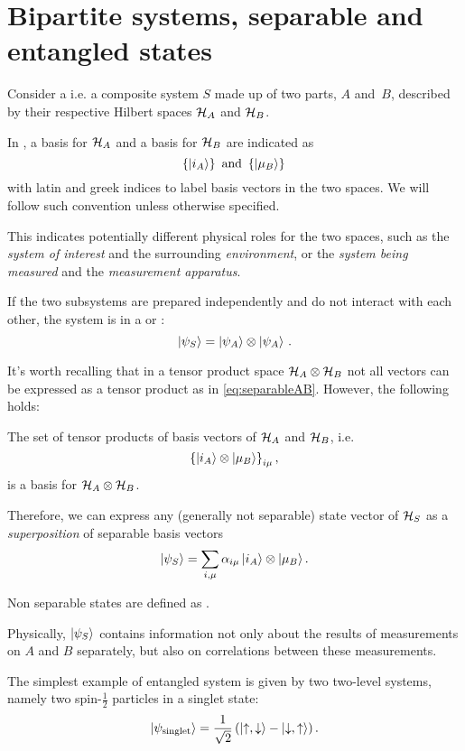 \section{Bipartite systems, separable and entangled states}

Consider a 
i.e. a composite system $S$
made up of two parts, $A$ and~$B$,
described by their respective Hilbert spaces
$\mathcal{H}_A$ and $\mathcal{H}_B$.

In \cite{Haroche_Exploring},
a basis for $\mathcal{H}_A$ and a basis for $\mathcal{H}_B$
are indicated as
$$
  \left\{\ket{i_A}\right\} \text{ and } \left\{\ket{\mu_B}\right\}\,
$$
with latin and greek indices to label basis vectors in the two spaces.
We will follow such convention unless otherwise specified.

This indicates potentially different physical roles for the two spaces,
such as the \emph{system of interest} and the surrounding \emph{environment},
or the \emph{system being measured} and the \emph{measurement apparatus}.

If the two subsystems are prepared independently and do not interact with each other,
the system is in a  or :
\begin{equation}\label{eq:separableAB}
  \ket{\psi_S} = \ket{\psi_A}\otimes\ket{\psi_A} \,\text{.}
\end{equation}

It's worth recalling that in a tensor product space $\mathcal{H}_A\otimes\mathcal{H}_B$
not all vectors can be expressed as a tensor product as in \eqref{eq:separableAB}.
However, the following holds:

\begin{proposition}\label{TensorBase}
The set of tensor products of basis vectors of $\mathcal{H}_A$ and $\mathcal{H}_B$,
i.e. $$\left\{\ket{i_A} \otimes \ket{\mu_B}\right\}_{i\mu},$$
is a basis for $\mathcal{H}_A \otimes \mathcal{H}_B$.
\end{proposition}
Therefore, we can express any
(generally not separable) state vector of $\mathcal{H}_S$
as a \emph{superposition} of separable basis vectors
\begin{equation}\label{eq:bipartite_expansion}
  \ket{\psi_S} = \sum_{i, \mu}\alpha_{i\mu}\ket{i_A}\otimes\ket{\mu_B} \text{.}
\end{equation}

\begin{definition}
  Non separable states are defined as .  
\end{definition}

Physically,
$\ket{\psi_S}$ contains information
not only about the results of measurements on $A$ and $B$ separately,
but also on correlations between these measurements.

The simplest example of entangled system is given by two two-level systems,
namely two spin-$\frac{1}{2}$ particles in a singlet state:
\[
  \ket{\psi_{\text{singlet}}} = \frac{1}{\sqrt{2}} \left(\ket{\uparrow, \downarrow} - \ket{\downarrow, \uparrow}\right).
\]
